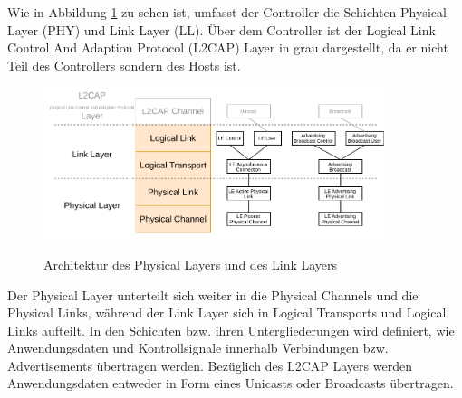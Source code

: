 Wie in Abbildung \ref{fig: controller architektur} zu sehen ist, umfasst der Controller die Schichten Physical Layer (PHY) und Link Layer (LL). Über dem Controller ist der Logical Link Control And Adaption Protocol (L2CAP) Layer in grau dargestellt, da er nicht Teil des Controllers sondern des Hosts ist.

\begin{figure}[H]
    \centering
    \includegraphics[width=0.9\textwidth]{graphics/controller_layers.pdf}
    \caption[Architektur des Physical Layers und des Link Layers]{Architektur des Physical Layers und des Link Layers \cite{BtSpec4.0_fig_145}} \cite{BtSpec4.0_fig_151}
    \label{fig: controller architektur}
\end{figure}

Der Physical Layer unterteilt sich weiter in die Physical Channels und die Physical Links, während der Link Layer sich in Logical Transports und Logical Links aufteilt. In den Schichten bzw. ihren Untergliederungen wird definiert, wie Anwendungsdaten und Kontrollsignale innerhalb Verbindungen bzw. Advertisements übertragen werden. Bezüglich des L2CAP Layers werden Anwendungsdaten entweder in Form eines Unicasts oder Broadcasts übertragen.